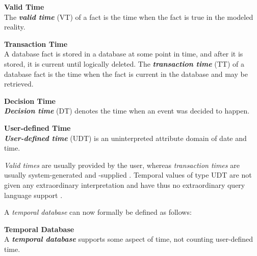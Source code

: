\begin{svgraybox}
\vspace{-10pt}
\begin{definition}\textbf{Valid Time}~\cite{Dyreson1994}\\
The \emph{\textbf{valid time}} (VT) of a fact is the time when the fact is true in the modeled reality.
\end{definition}

\begin{definition}\textbf{Transaction Time}~\cite{Dyreson1994}\\
A database fact is stored in a database at some point in time, and after it is stored, it is current until logically deleted. The \emph{\textbf{transaction time}} (TT) of a database fact is the time when the fact is current in the database and may be retrieved.
\end{definition}

\begin{definition}\textbf{Decision Time}~\cite{Nascimento95decisiontime}\\
\emph{\textbf{Decision time}} (DT) denotes the time when an event was decided to happen.
\end{definition}

\begin{definition}\textbf{User-defined Time}~\cite{Dyreson1994}\\
\emph{\textbf{User-defined time}} (UDT) is an uninterpreted attribute domain of date and time.
\end{definition}
\vspace{-10pt}
\end{svgraybox}

\emph{Valid times} are usually provided by the user, whereas \emph{transaction times} are usually system-generated and -supplied \cite{Dyreson1994}. Temporal values of type UDT are not given any extraordinary interpretation and have thus no extraordinary query language support \cite{Dyreson1994}.

A \emph{temporal database} can now formally be defined as follows:

\begin{svgraybox}
\vspace{-10pt}
\begin{definition}\textbf{Temporal Database}~\cite{Dyreson1994}\\
A \emph{\textbf{temporal database}} supports some aspect of time, not counting user-defined time.
\end{definition}
\vspace{-10pt}
\end{svgraybox}

